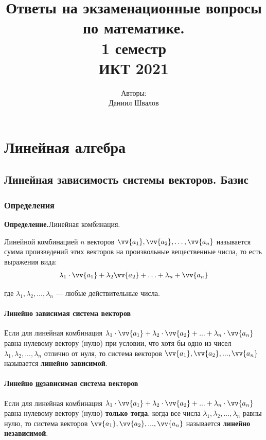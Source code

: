 \documentclass[a4paper,12pt]{extbook}
\title{
    Ответы на экзаменационные вопросы по математике. \\
    \vspace{2cm} 1 семестр \\
    \vspace{2cm} ИКТ 2021
    \vfill
}
\author{
    Авторы: \\
    Даниил Швалов
}
\date{}
\newcommand{\newpar}{$ $\par\nobreak\ignorespaces}
\newenvironment{definition}[1][]{\noindent\textbf{Определение.}\if\relax\detokenize{#1}\relax\else\;#1.\newpar\fi\;}{\bigskip}
\theoremstyle{numbered}
\theoremstyle{named}
\theoremstyle{named}
\theoremstyle{named}
\begin{document}
\begin{titlepage}
    \maketitle
    \thispagestyle{empty}
\end{titlepage}
\setcounter{tocdepth}{5}

\setcounter{page}{2}
{
    \hypersetup{linkcolor=black}
    \tableofcontents
}

\chapter{Линейная алгебра}

\section{Линейная зависимость системы векторов. Базис}\label{sec:linear-dependence}

\subsection*{Определения}

\begin{definition}[Линейная комбинация]
    Линейной комбинацией \(n\) векторов \(\vv{a_1}, \vv{a_2}, \ldots, \vv{a_n}\) называется сумма произведений этих векторов на произвольные вещественные числа, то есть выражения вида:
    \begin{gather*}
        \lambda_1 \cdot \vv{a_1} + \lambda_2 \vv{a_2} + \ldots + \lambda_n + \vv{a_n}
    \end{gather*}

    где \(\lambda_1, \lambda_2, \ldots, \lambda_n\) — любые действительные числа.
\end{definition}

\subsubsection*{Линейно зависимая система векторов}
Если для линейная комбинация \(\lambda_1 \cdot \vv{a_1} + \lambda_2 \cdot \vv{a_2} + ... + \lambda_n \cdot \vv{a_n}\) равна нулевому вектору (нулю) при условии, что хотя бы одно из чисел \(\lambda_1, \lambda_2, ..., \lambda_n\) отлично от нуля, то система векторов \(\vv{a_1}, \vv{a_2}, ..., \vv{a_n}\) называется \textbf{линейно зависимой}.

\subsubsection*{Линейно \underline{не}зависимая система векторов}
Если для линейная комбинация \(\lambda_1 \cdot \vv{a_1} + \lambda_2 \cdot \vv{a_2} + ... + \lambda_n \cdot \vv{a_n}\) равна нулевому вектору (нулю) \textbf{только тогда}, когда все числа \(\lambda_1, \lambda_2, ..., \lambda_n\) равны нулю, то система векторов \(\vv{a_1}, \vv{a_2}, ..., \vv{a_n}\) называется \textbf{линейно независимой}.
\end{document}
